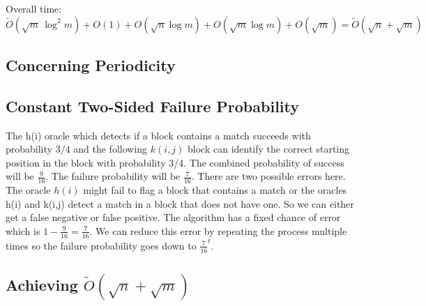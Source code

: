 \documentclass[12pt]{IEEEtran}
\begin{document}
Overall time: \(\widetilde O(\sqrt{m}\,\log^2 m) + O(1) + O(\sqrt{n} \log m) + O(\sqrt{m} \log m) + O(\sqrt{m}) = \widetilde{O}(\sqrt{n} + \sqrt{m})\)

\subsection{Concerning Periodicity}

\subsection{Constant Two-Sided Failure Probability}
The h(i) oracle which detects if a block contains a match succeeds with probability \(3/4\) and the following \(k(i,j)\) block can identify the correct starting position in the block with probability 3/4.
The combined probability of success will be \(\frac{9}{16}\). The failure probability will be \(\frac{7}{16}\). There are two possible errors here. The oracle \(h(i)\) might fail to flag a block that contains a match or
the oracles h(i) and k(i,j) detect a match in a block that does not have one. So we can either get a false negative or false positive. The algorithm has a fixed chance of error which is \(1-\frac{9}{16} = \frac{7}{16}\).
We can reduce this error by repeating the process multiple times so the failure probability goes down to \(\frac{7}{16}^t\).
\subsection{Achieving \texorpdfstring{$\tilde{O}(\sqrt{n} + \sqrt{m})$}{O(sqrt(n)+sqrt(m))}}



\end{document}

